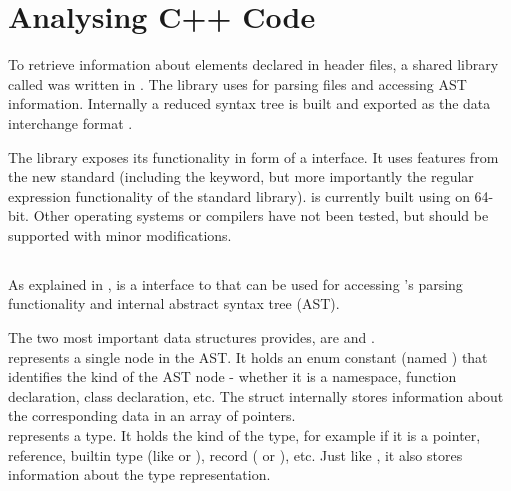 \chapter{Analysing C++ Code}
\label{chap:AnalysingCPP}

To retrieve information about elements declared in  header files, a shared library called  was written in . The library uses  for parsing  files and accessing AST information. Internally a reduced syntax tree is built and exported as the data interchange format .

The library exposes its functionality in form of a  interface. It uses features from the new  standard  (including the  keyword, but more importantly the regular expression functionality of the standard library).  is currently built using  on  64-bit. Other operating systems or compilers have not been tested, but should be supported with minor modifications.

\section{}

As explained in ,  is a  interface to  that can be used for accessing 's parsing functionality and internal abstract syntax tree (AST).

The two most important data structures  provides, are  and .
\\ represents a single node in the AST. It holds an enum constant (named ) that identifies the kind of the AST node - whether it is a namespace, function declaration, class declaration, etc. The  struct  internally stores information about the corresponding  data in an array of  pointers.
\\ represents a  type. It holds the kind of the type, for example if it is a pointer, reference, builtin type (like  or ), record ( or ), etc. Just like , it also stores information about the  type representation.

